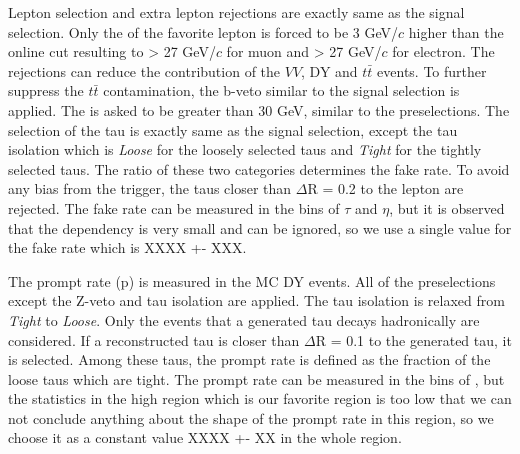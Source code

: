 Lepton selection and extra lepton rejections are exactly same as the signal selection. Only the \pT of the favorite lepton is forced to 
be 3 GeV/$c$ higher than the online cut resulting to \pT > 27 GeV/$c$ for muon and \pT > 27 GeV/$c$ for electron.
The rejections can reduce the contribution of the $VV$, DY and $t\bar{t}$ events. To further suppress the $t\bar{t}$ contamination, the b-veto 
similar to the signal selection is applied. The \met is asked to be greater than 30 GeV, similar to the preselections. The selection of the tau is 
exactly same as the signal selection, except the tau isolation which is {\it Loose} for the loosely selected taus and {\it Tight} for the 
tightly selected taus.
The ratio of these two categories determines the fake rate. To avoid any bias from the trigger, the taus closer than $\Delta$R = 0.2 to the 
lepton are rejected. 
The fake rate can be measured in the bins of $\tau$ \pT and $\eta$, but it is observed that the dependency is very small and can be ignored, 
so we use a single value for the fake rate which is XXXX +- XXX.

The prompt rate (p) is measured in the MC DY events. All of the preselections except the Z-veto and tau isolation are applied. The tau isolation 
is relaxed from {\it Tight} to {\it Loose}. Only the events that a generated tau decays hadronically are considered. If a reconstructed tau is 
closer than $\Delta$R = 0.1 to the generated tau, it is selected. Among these taus, the prompt rate is defined as the fraction of the loose taus 
which are tight. The prompt rate can be measured in the bins of \mttwo, but the statistics in the high \mttwo region which is our favorite 
region is too low that we can not conclude anything about the shape of the prompt rate in this region, so we choose it as a constant value
XXXX +- XX in the whole \mttwo region.



